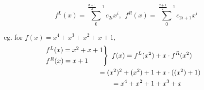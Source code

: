 \documentclass{article}
\theoremstyle{definition}
\begin{document}
$$f^L(x)= \sum_0^{\frac{d+1}{2}-1} c_{2i} x^i ,~~ f^R(x)= \sum_0^{\frac{d+1}{2}-1} c_{2i+1} x^i$$

eg. for $f(x)=x^4+x^3+x^2+x+1$,
\begin{align*}
	\begin{rcases}
	f^L(x)=x^2+x+1\\
	f^R(x)=x+1
	\end{rcases}
	~f(x) = f^L(x^2) &+ x \cdot f^R(x^2)\\
	= (x^2)^2 + (x^2) + 1 &+ x \cdot ((x^2) + 1)\\
	= x^4 + x^2 + 1 &+ x^3 + x
\end{align*}

% 
% 
\end{document}
